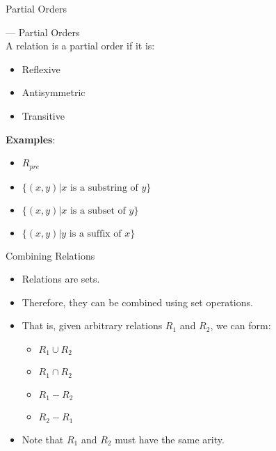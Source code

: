 \begin{slide}[bm=,toc=]{Partial Orders}
\begin{defn}{--- Partial Orders}~\\
A relation is a partial order if it is:

\begin{itemize}
\item Reflexive
\item Antisymmetric
\item Transitive
\end{itemize}
\textbf{Examples}:
\begin{itemize}
\item $R_{pre}$
\item $\{(x,y) | x \text{ is a substring of } y \}$
\item $\{(x,y) | x \text{ is a subset of } y \}$
\item $\{(x,y) | y \text{ is a suffix of } x \}$
\end{itemize}
\end{defn}
\end{slide}
\begin{slide}[bm=,toc=]{Combining Relations}
\begin{itemize}
\item Relations are sets.
\item Therefore, they can be combined using set operations.
\item That is, given arbitrary relations $R_1$ and $R_2$, we can form:
\begin{itemize}
\item $R_1 \cup R_2$
\item $R_1 \cap R_2$
\item $R_1 - R_2$
\item $R_2 - R_1$
\end{itemize}
\item Note that $R_1$ and $R_2$ must have the same arity.
\end{itemize}
\end{slide}

